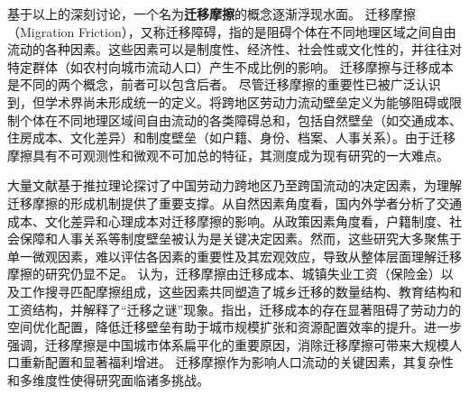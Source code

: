 \documentclass[a4paper,12pt,oneside, fontset=mac]{ctexbook} %
\begin{document}
基于以上的深刻讨论，一个名为\textbf{迁移摩擦}的概念逐渐浮现水面。
迁移摩擦（Migration Friction），又称迁移障碍，指的是阻碍个体在不同地理区域之间自由流动的各种因素。这些因素可以是制度性、经济性、社会性或文化性的，并往往对特定群体（如农村向城市流动人口）产生不成比例的影响。
迁移摩擦与迁移成本是不同的两个概念，前者可以包含后者。
尽管迁移摩擦的重要性已被广泛认识到，但学术界尚未形成统一的定义。\cite{JiangWeiZhongGuoKuaDiQuLaoDongLiLiuDongBiLeiCeDuFangFaYanJinQuShiYuJueDingYinSu2024}将跨地区劳动力流动壁垒定义为能够阻碍或限制个体在不同地理区域间自由流动的各类障碍总和，包括自然壁垒（如交通成本、住房成本、文化差异）和制度壁垒（如户籍、身份、档案、人事关系）。由于迁移摩擦具有不可观测性和微观不可加总的特征，其测度成为现有研究的一大难点。

大量文献基于推拉理论探讨了中国劳动力跨地区乃至跨国流动的决定因素，为理解迁移摩擦的形成机制提供了重要支撑。从自然因素角度看，国内外学者分析了交通成本、文化差异和心理成本对迁移摩擦的影响。从政策因素角度看，户籍制度、社会保障和人事关系等制度壁垒被认为是关键决定因素。然而，这些研究大多聚焦于单一微观因素，难以评估各因素的重要性及其宏观效应，导致从整体层面理解迁移摩擦的研究仍显不足。
\cite{WangLiLiWoGuoRenKouQianYiChengBenChengShiGuiMoYuShengChanLu2020}认为，迁移摩擦由迁移成本、城镇失业工资（保险金）以及工作搜寻匹配摩擦组成，这些因素共同塑造了城乡迁移的数量结构、教育结构和工资结构，并解释了“迁移之谜”现象。\cite{WangLiLiWoGuoRenKouQianYiChengBenChengShiGuiMoYuShengChanLu2020}指出，迁移成本的存在显著阻碍了劳动力的空间优化配置，降低迁移壁垒有助于城市规模扩张和资源配置效率的提升。\cite{LiuXiuYanFangJieQianYiMoCaYuZhongGuoChengShiDeGuiMoFenBuLiLunMoXingYuJieGouShiGuJi2017}进一步强调，迁移摩擦是中国城市体系扁平化的重要原因，消除迁移摩擦可带来大规模人口重新配置和显著福利增进。
迁移摩擦作为影响人口流动的关键因素，其复杂性和多维度性使得研究面临诸多挑战。
\end{document}
